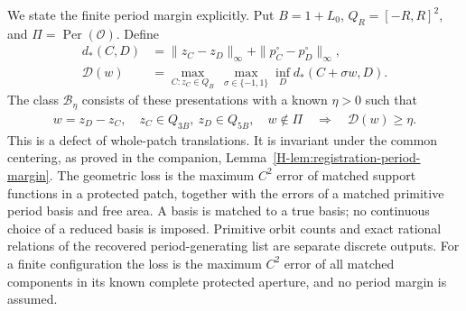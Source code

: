 We state the finite period margin explicitly. Put $B=1+L_0$,
$Q_R=[-R,R]^2$, and $\Pi=\operatorname{Per}(\mathcal O)$. Define
\begin{align}
 d_*(C,D)&=\|z_C-z_D\|_\infty+
                         \|p_C^\circ-p_D^\circ\|_\infty,\nonumber\\
 \mathcal D(w)&=\max_{C:z_C\in Q_B}\ \max_{\sigma\in\{-1,1\}}
                            \inf_D d_*(C+\sigma w,D).
                   \label{eq:two-field-patch-defect}
\end{align}
The class $\mathcal B_\eta$ consists of these presentations with a
known $\eta>0$ such that
\begin{equation}\label{eq:two-field-patch-margin}
 \begin{gathered}
 w=z_D-z_C,\quad z_C\in Q_{3B},\ z_D\in Q_{5B},\quad w\notin\Pi
                 \quad\Longrightarrow\quad\mathcal D(w)\ge\eta.
 \end{gathered}
\end{equation}
This is a defect of whole-patch translations. It is invariant under
the common centering, as proved in the companion,
Lemma~\ref{H-lem:registration-period-margin}. The geometric loss is
the maximum $C^2$ error of matched support functions in a protected
patch, together with the errors of a matched primitive period basis
and free area. A basis is matched to a true basis; no continuous
choice of a reduced basis is imposed. Primitive orbit counts and
exact rational relations of the recovered period-generating list are
separate discrete outputs. For a finite configuration the loss is
the maximum $C^2$ error of all matched components in its known
complete protected aperture, and no period margin is assumed.

